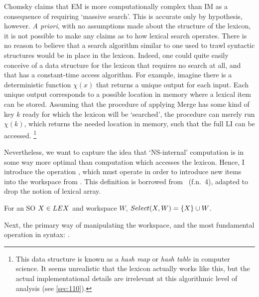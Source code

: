 Chomsky claims that EM is more computationally complex than IM as a consequence of requiring `massive search'. This is accurate only by hypothesis, however. \textit{A priori}, with no assumptions made about the structure of the lexicon, it is not possible to make any claims as to how lexical search operates. There is no reason to believe that a search algorithm similar to one used to trawl syntactic structures would be in place in the lexicon. Indeed, one could quite easily conceive of a data structure for the lexicon that requires no search at all, and that has a constant-time access algorithm. For example, imagine there is a deterministic function $\chi(x)$ that returns a unique output for each input. Each unique output corresponds to a possible location in memory where a lexical item can be stored. Assuming that the procedure of applying Merge has some kind of key $k$ ready for which the lexicon will be `searched', the procedure can merely run $\chi(k)$, which returns the needed location in memory, such that the full LI can be accessed.%
\footnote{This data structure is known as a \textit{hash map} or \textit{hash table} in computer science. It seems unrealistic that the lexicon actually works like this, but the actual implementational details are irrelevant at this algorithmic level of analysis (see \autoref{sec:110}).}

Nevertheless, we want to capture the idea that `NS-internal' computation is in some way more optimal than computation which accesses the lexicon. Hence, I introduce the operation \Select, which must operate in order to introduce new items into the workspace from \LEX. This definition is borrowed from \CS\ (f.n.~4), adapted to drop the notion of lexical array.

\begin{definition}
    For an SO $X\in LEX$ and workspace $W$, $Select(X, W)=\{X\} \cup W$.
\end{definition}
\noindent
Next, the primary way of manipulating the workspace, and the most fundamental operation in syntax: \Merge.

